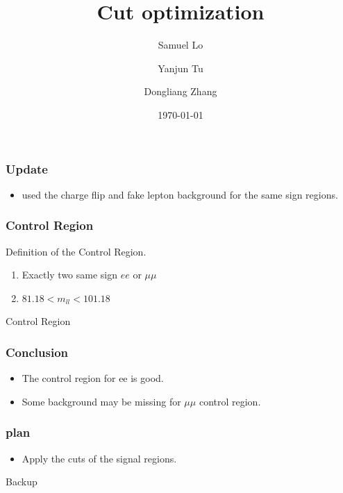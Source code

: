\documentclass[mathserif,serif]{beamer}
\title{Cut optimization}
\author
{
Samuel Lo \inst{1}
\and
Yanjun Tu  \inst{1}
\and
Dongliang Zhang  \inst{2}
}
\institute
{
\inst{1}
The University of Hong Kong
\and
\inst{2}
University of Michigan
}
\date{\today}
\begin{document}
\frame{\titlepage}

\begin{frame}
\frametitle{Update}
\begin{itemize}
\normalsize
\item used the charge flip and fake lepton background for the same sign regions.
\end{itemize}
\end{frame}

\begin{frame}
\frametitle{Control Region}
Definition of the Control Region.
\begin{enumerate}
\item Exactly two same sign $ee$ or $\mu\mu$
\item $81.18 < m_{ll} < 101.18$
\end{enumerate}
\end{frame}

\begin{frame}
\begin{center}
\huge
Control Region
\end{center}
\end{frame}



\def \PathToPlot {../plot}


%

\begin{frame}
\frametitle{Conclusion}
\begin{itemize}
\item The control region for ee is good.
\item Some background may be missing for $\mu\mu$ control region.
\end{itemize}
\end{frame}

\begin{frame}
\frametitle{plan}
\begin{itemize}
\item Apply the cuts of the signal regions.
\end{itemize}
\end{frame}

\begin{frame}
\begin{center}
\huge
Backup
\end{center}
\end{frame}
\end{document}
